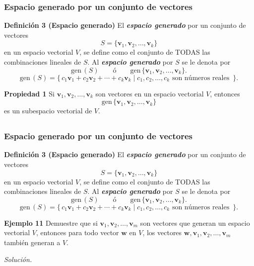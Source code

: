 {\nologo
\begin{frame}\frametitle{Espacio generado por un conjunto de vectores}

\begin{block}{\textbf{Definición 3 (Espacio generado)}}
	\justifying
	El \textbf{\textit{espacio generado}} por un conjunto de vectores 
	\[
	S=\{\mathbf{v}_1,\mathbf{v}_2,\hdots,\mathbf{v}_k\}
	\]
	en un espacio vectorial $V$, se define como el conjunto de TODAS las combinaciones lineales de $S$.
	Al \textbf{\textit{espacio generado}} por $S$ se le denota por 
	\[
	\text{gen}\,(S) \qquad \text{ó} \qquad \text{gen}\, \{\mathbf{v}_1,\mathbf{v}_2,\hdots,\mathbf{v}_k\}.
	\]
	\[
	\text{gen}\,(S) = \Big\{ \, c_1\mathbf{v}_1 + c_2\mathbf{v}_2 + \cdots + c_k\mathbf{v}_k \mid c_1, c_2,\hdots,c_k  
	\text{ son números reales } \, \Big\}.
	\]
\end{block}

\begin{prop}{\textbf{Propiedad 1}}
	Si $\mathbf{v}_1,\mathbf{v}_2,\hdots,\mathbf{v}_k$ son vectores en un espacio vectorial $V$, entonces 
	\[
		\text{gen}\, \{\mathbf{v}_1,\mathbf{v}_2,\hdots,\mathbf{v}_k\}
	\]
	es un subespacio vectorial de $V$.
\end{prop}	

\end{frame}
}


\subsection{}

{\nologo
\begin{frame}\frametitle{Espacio generado por un conjunto de vectores}

\vspace{-2mm}	

	\begin{block}{\textbf{Definición 3 (Espacio generado)}}
		\justifying
		El \textbf{\textit{espacio generado}} por un conjunto de vectores 
		\[
		S=\{\mathbf{v}_1,\mathbf{v}_2,\hdots,\mathbf{v}_k\}
		\]
		en un espacio vectorial $V$, se define como el conjunto de TODAS las combinaciones lineales de $S$.
		Al \textbf{\textit{espacio generado}} por $S$ se le denota por 
		\[
		\text{gen}\,(S) \qquad \text{ó} \qquad \text{gen}\, \{\mathbf{v}_1,\mathbf{v}_2,\hdots,\mathbf{v}_k\}.
		\]
		\[
		\text{gen}\,(S) = \Big\{ \, c_1\mathbf{v}_1 + c_2\mathbf{v}_2 + \cdots + c_k\mathbf{v}_k \mid c_1, c_2,\hdots,c_k  
		\text{ son números reales } \, \Big\}.
		\]
	\end{block}
	
	\begin{ej}{\textbf{Ejemplo 11}} \justifying
		Demuestre que si $\mathbf{v}_1,\mathbf{v}_2,\hdots,\mathbf{v}_m$ son vectores que generan un espacio vectorial $V$, entonces para todo vector $\mathbf{w}$ en $V$, los vectores
		$\mathbf{w}, \mathbf{v}_1,\mathbf{v}_2,\hdots,\mathbf{v}_m$  también generan a $V$.
	\end{ej}
	\textit{Solución.}
	
\end{frame}
}

